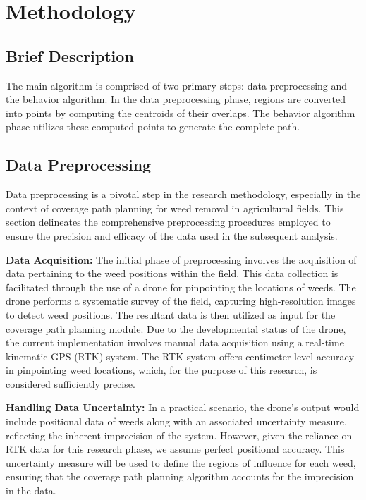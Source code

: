 \section{Methodology}

\subsection{Brief Description}

The main algorithm is comprised of two primary steps: data preprocessing and the behavior algorithm. In the data preprocessing phase, regions are converted into points by computing the centroids of their overlaps. The behavior algorithm phase utilizes these computed points to generate the complete path.

\subsection{Data Preprocessing}


Data preprocessing is a pivotal step in the research methodology, especially in the context of coverage path planning for weed removal in agricultural fields. This section delineates the comprehensive preprocessing procedures employed to ensure the precision and efficacy of the data used in the subsequent analysis.

\vspace*{6mm}  


\textbf{Data Acquisition: }
The initial phase of preprocessing involves the acquisition of data pertaining to the weed positions within the field. This data collection is facilitated through the use of a drone for pinpointing the locations of weeds. The drone performs a systematic survey of the field, capturing high-resolution images to detect weed positions. The resultant data is then utilized as input for the coverage path planning module. Due to the developmental status of the drone, the current implementation involves manual data acquisition using a real-time kinematic GPS (RTK) system. The RTK system offers centimeter-level accuracy in pinpointing weed locations, which, for the purpose of this research, is considered sufficiently precise. 

\vspace*{6mm}  


\textbf{Handling Data Uncertainty: }
In a practical scenario, the drone's output would include positional data of weeds along with an associated uncertainty measure, reflecting the inherent imprecision of the system. However, given the reliance on RTK data for this research phase, we assume perfect positional accuracy. This uncertainty measure will be used to define the regions of influence for each weed, ensuring that the coverage path planning algorithm accounts for the imprecision in the data. 


